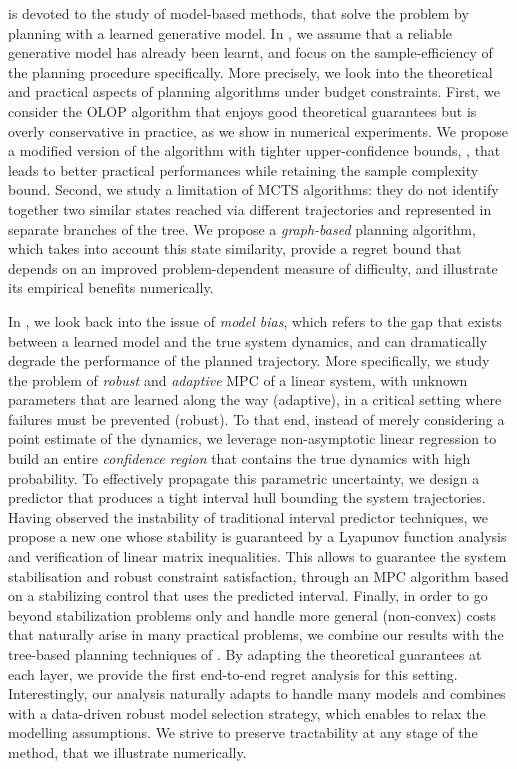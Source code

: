 \textbf{} is devoted to the study of \gls{model-based} methods, that solve the  problem by planning with a learned generative model.
In \textbf{}, we assume that a reliable generative model has already been learnt, and focus on the sample-efficiency of the planning procedure specifically. More precisely, we look into the theoretical and practical aspects of planning algorithms under budget constraints. First, we consider the \gls{OLOP} algorithm that enjoys good theoretical guarantees but is overly conservative in practice, as we show in numerical experiments. We propose a modified version of the algorithm with tighter upper-confidence bounds, \KLOLOP, that leads to better practical performances while retaining the sample complexity bound. Second, we study a limitation of \gls{MCTS} algorithms: they do not identify together two similar states reached via different trajectories and represented in separate branches of the tree. We propose a \emph{graph-based} planning algorithm, which takes into account this state similarity, provide a regret bound that depends on an improved problem-dependent measure of difficulty, and illustrate its empirical benefits numerically.

In \textbf{}, we look back into the issue of \emph{model bias}, which refers to the gap that exists between a learned model and the true system dynamics, and can dramatically degrade the performance of the planned trajectory. More specifically, we study the problem of \emph{robust} and \emph{adaptive} \gls{MPC} of a linear system, with unknown parameters that are learned along the way (adaptive), in a critical setting where failures must be prevented (robust).
To that end, instead of merely considering a point estimate of the dynamics, we leverage non-asymptotic linear regression to build an entire \emph{confidence region} that contains the true dynamics with high probability.
To effectively propagate this parametric uncertainty, we design a predictor that produces a tight interval hull bounding the system trajectories. Having observed the instability of traditional interval predictor techniques, we propose a new one whose stability is guaranteed by a Lyapunov function analysis and verification of linear matrix inequalities.
This allows to guarantee the system stabilisation and robust constraint satisfaction, through an \gls{MPC} algorithm based on a stabilizing control that uses the predicted interval.
Finally, in order to go beyond stabilization problems only and handle more general (non-convex) costs that naturally arise in many practical problems, we combine our results with the tree-based planning techniques of . By adapting the theoretical guarantees at each layer, we provide the first end-to-end regret analysis for this setting. Interestingly, our analysis naturally adapts to handle many models and combines with a data-driven robust model selection strategy, which enables to relax the modelling assumptions. We strive to preserve tractability at any stage of the method, that we illustrate numerically.

